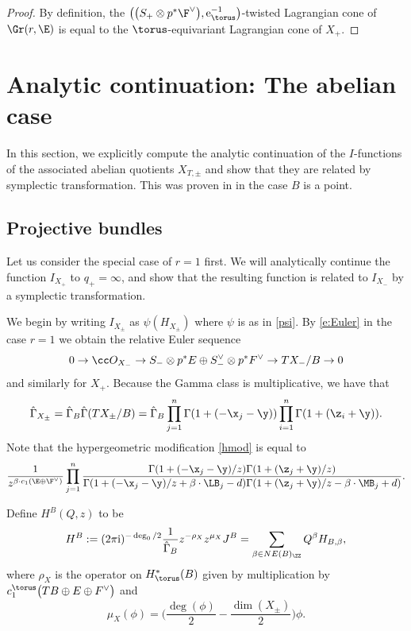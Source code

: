 \begin{proof}
By definition, the $\bigl(\bigl(S_+ \otimes p^*\F^\vee\bigr), {\rm e}^{-1}_{\torus}\bigr)$-twisted Lagrangian cone of $\Gr(r, \E)$ is equal to the $\torus$-equivariant Lagrangian cone of $X_+$.
\end{proof}

\section{Analytic continuation: The abelian case}

In this section, we explicitly compute the analytic continuation of the $I$-functions of the associated abelian quotients $X_{T, \pm}$ and show that they are related by symplectic transformation. This was proven in \cite{CIJ} in the case $B$ is a point.

\subsection{Projective bundles}
Let us consider the special case of $r=1$ first. We will analytically continue the function $I_{X_+}$ to $q_+ = \infty$, and show that the resulting function is related to $I_{X_-}$ by a symplectic transformation.

We begin by writing $I_{X_\pm}$ as $\psi (H_{X_\pm})$ where $\psi$ is as in \eqref{psi}.
By \eqref{e:Euler} in the case $r=1$ we obtain the relative Euler sequence
\[
0 \to \cc O_{X_-} \to S_- \otimes p^*E \oplus S_-^\vee \otimes p^*F^\vee \to TX_{-}/B \to 0
\]
and similarly for $X_+$.
Because the Gamma class is multiplicative, we have that
\begin{align*}
\hat \Gamma_{X_\pm} = \hat \Gamma_{B} \hat \Gamma(TX_\pm/B)
 =\hat \Gamma_{B} \prod_{j=1}^n \Gamma(1 + (- \x_j - \y)) \prod_{i=1}^n \Gamma(1 + (\z_i + \y)).
\end{align*}
Note that the hypergeometric modification \eqref{hmod} is equal to
\begin{equation*}\frac{1}{z^{\beta \cdot c_1(\E \oplus \F^\vee)}}\prod_{j=1}^n\frac{ \Gamma(1 + (- \x_j - \y)/z) \Gamma(1 + (\z_j + \y)/z)}{ \Gamma(1 + (- \x_j - \y)/z + \beta \cdot \LB_j-d) \Gamma(1 + (\z_j + \y)/z - \beta \cdot \MB_j + d)}.
\end{equation*}

Define $H^B(Q ,z)$ to be
\begin{align*} H^B := (2 \pi {\rm i})^{-\deg_0/2}\frac{1}{\hat \Gamma_B} z^{- \rho_{X}} z^{\mu_{X}} J^B
 =
\sum_{\beta \in NE(B)_\ZZ} Q^\beta H_{B, \beta},\end{align*}
where $\rho_{X}$ is the operator on $H^*_\torus(B)$ given by multiplication by
$c_1^\torus\bigl(TB \oplus E \oplus F^\vee\bigr)$ and
\[
\mu_{X}(\phi) = \biggl( \frac{\deg(\phi)}{2} -\frac{ \dim(X_\pm)}{2} \biggr) \phi.
\]


